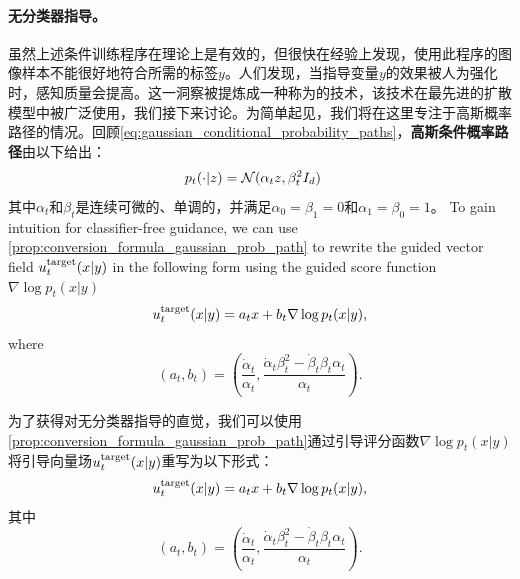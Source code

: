 \paragraph{无分类器指导。} 虽然上述条件训练程序在理论上是有效的，但很快在经验上发现，使用此程序的图像样本不能很好地符合所需的标签$y$。人们发现，当指导变量$y$的效果被人为强化时，感知质量会提高。这一洞察被提炼成一种称为的技术，该技术在最先进的扩散模型中被广泛使用，我们接下来讨论。为简单起见，我们将在这里专注于高斯概率路径的情况。回顾\cref{eq:gaussian_conditional_probability_paths}，\textbf{高斯条件概率路径}由以下给出：
\begin{align*}
    p_t(\cdot|z) &= \mathcal{N}(\alpha_t z,\beta_t^2 I_d)
\end{align*}
其中$\alpha_t$和$\beta_t$是连续可微的、单调的，并满足$\alpha_0 = \beta_1 = 0$和$\alpha_1 = \beta_0 = 1$。 
To gain intuition for classifier-free guidance, we can use \cref{prop:conversion_formula_gaussian_prob_path} to rewrite the guided vector field $u^{\text{target}}_t(x|y)$ in the following form using the guided score function $\nabla\log p_t(x|y)$
\begin{equation}
    u^{\text{target}}_t(x|y) = a_tx + b_t\nabla \log p_t(x|y),
\end{equation}
where 
\begin{equation}
   (a_t, b_t) = \left(\frac{\dot{\alpha}_t}{\alpha_t}, \frac{\dot{\alpha}_t \beta_t^2-\dot{\beta}_t \beta_t \alpha_t}{\alpha_t}\right). 
\end{equation}

为了获得对无分类器指导的直觉，我们可以使用\cref{prop:conversion_formula_gaussian_prob_path}通过引导评分函数$\nabla\log p_t(x|y)$将引导向量场$u^{\text{target}}_t(x|y)$重写为以下形式：
\begin{equation}
    u^{\text{target}}_t(x|y) = a_tx + b_t\nabla \log p_t(x|y),
\end{equation}
其中
\begin{equation}
   (a_t, b_t) = \left(\frac{\dot{\alpha}_t}{\alpha_t}, \frac{\dot{\alpha}_t \beta_t^2-\dot{\beta}_t \beta_t \alpha_t}{\alpha_t}\right). 
\end{equation}

